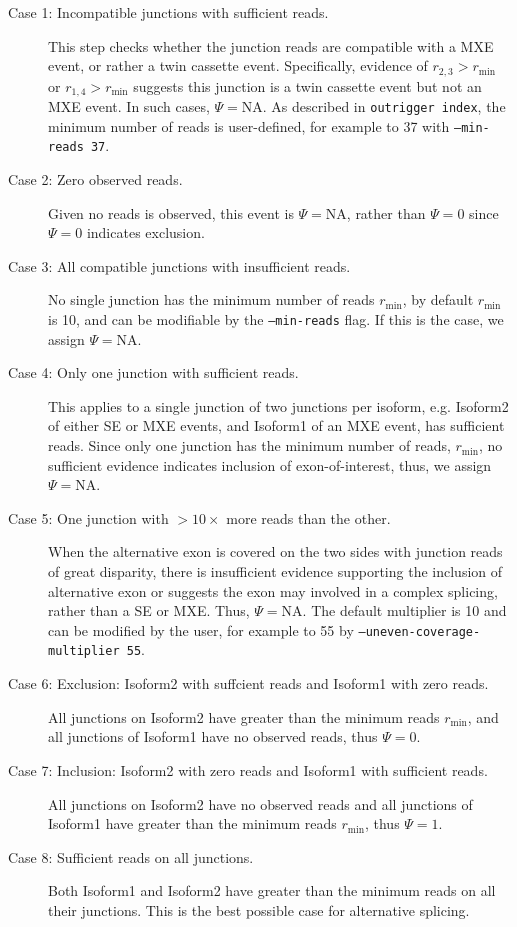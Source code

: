 \begin{description}
	\item[Case 1: Incompatible junctions with sufficient reads.] This step checks whether the junction reads are compatible with a MXE event, or rather a twin cassette event. Specifically, evidence of  $r_{2,3} > r_{\min}$ or $r_{1,4} > r_{\min}$ suggests this junction is a twin cassette event but not an MXE event. In such cases, $\Psi = \text{NA}$. As described in \texttt{outrigger index}, the minimum number of reads is user-defined, for example to 37 with \texttt{--min-reads~37}. 
	\item[Case 2: Zero observed reads.] Given no reads is observed, this event is $\Psi = \text{NA}$, rather than $\Psi=0$ since $\Psi=0$ indicates exclusion. 
	\item[Case 3: All compatible junctions with insufficient reads.] No single junction has the minimum number of reads $r_{\min}$, by default $r_{\min}$ is 10, and can be modifiable by the \texttt{--min-reads} flag. If this is the case, we assign $\Psi = \text{NA}$.
	\item[Case 4: Only one junction with sufficient reads.] This applies to a single junction of two junctions per isoform, e.g. Isoform2 of either SE or MXE events, and Isoform1 of an MXE event, has sufficient reads. Since only one junction has the minimum number of reads, $r_{\min}$, no sufficient evidence indicates inclusion of exon-of-interest, thus, we assign $\Psi = \text{NA}$.
	\item[Case 5: One junction with $>10\times$ more reads than the other.] When the alternative exon is covered on the two sides with junction reads of great disparity, there is insufficient evidence supporting the inclusion of alternative exon or suggests the exon may involved in a complex splicing, rather than a SE or MXE. Thus, $\Psi = \text{NA}$. The default multiplier is 10 and can be modified by the user, for example to 55 by \texttt{--uneven-coverage-multiplier~55}. 
	\item[Case 6: Exclusion: Isoform2 with suffcient reads and Isoform1 with zero reads.] All junctions on Isoform2 have greater than the minimum reads $r_{\min}$, and all junctions of Isoform1 have no observed reads, thus $\Psi = 0$.
	\item[Case 7: Inclusion: Isoform2 with zero reads and Isoform1 with sufficient reads.] All junctions on Isoform2 have no observed reads and all junctions of Isoform1 have greater than the minimum reads $r_{\min}$, thus $\Psi = 1$.
	\item[Case 8: Sufficient reads on all junctions.] Both Isoform1 and Isoform2 have greater than the minimum reads on all their junctions. This is the best possible case for alternative splicing.

\end{description}
